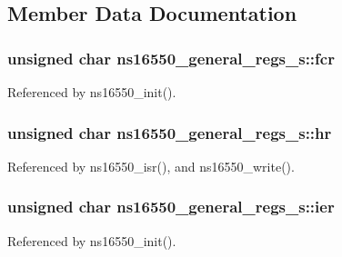 \subsection{Member Data Documentation}
\hypertarget{structns16550__general__regs__s_aeca87c04598fd8e717b5514d61a58048}{
\subsubsection[{fcr}]{\setlength{\rightskip}{0pt plus 5cm}unsigned char ns16550\-\_\-general\-\_\-regs\-\_\-s\-::fcr}}\label{structns16550__general__regs__s_aeca87c04598fd8e717b5514d61a58048}


Referenced by ns16550\-\_\-init().

\hypertarget{structns16550__general__regs__s_a0648ee0f30ad5388707d65e8ff11df40}{
\subsubsection[{hr}]{\setlength{\rightskip}{0pt plus 5cm}unsigned char ns16550\-\_\-general\-\_\-regs\-\_\-s\-::hr}}\label{structns16550__general__regs__s_a0648ee0f30ad5388707d65e8ff11df40}


Referenced by ns16550\-\_\-isr(), and ns16550\-\_\-write().

\hypertarget{structns16550__general__regs__s_af3ab39032c2a64d4758bfdd2a6012e4a}{
\subsubsection[{ier}]{\setlength{\rightskip}{0pt plus 5cm}unsigned char ns16550\-\_\-general\-\_\-regs\-\_\-s\-::ier}}\label{structns16550__general__regs__s_af3ab39032c2a64d4758bfdd2a6012e4a}


Referenced by ns16550\-\_\-init().

